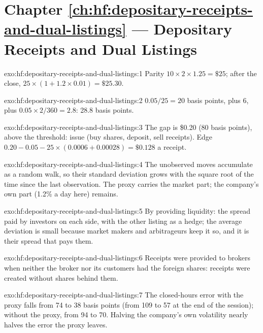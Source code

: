\section*{Chapter \ref{ch:hf:depositary-receipts-and-dual-listings} --- Depositary Receipts and Dual Listings}

\begin{solution}{exo:hf:depositary-receipts-and-dual-listings:1}
Parity $10\times2\times1.25=\$25$; after the close, $25\times(1+1.2\times0.01)=\$25.30$.
\end{solution}

\begin{solution}{exo:hf:depositary-receipts-and-dual-listings:2}
$0.05/25=20$ basis points, plus 6, plus $0.05\times2/360=2.8$: 28.8 basis points.
\end{solution}

\begin{solution}{exo:hf:depositary-receipts-and-dual-listings:3}
The gap is \$0.20 (80 basis points), above the threshold: issue (buy shares, deposit, sell receipts). Edge $0.20-0.05-25\times(0.0006+0.00028)=\$0.128$
a receipt.
\end{solution}

\begin{solution}{exo:hf:depositary-receipts-and-dual-listings:4}
The unobserved moves accumulate as a random walk, so their standard deviation grows with the square root of the time since the last observation. The
proxy carries the market part; the company's own part (1.2\% a day here) remains.
\end{solution}

\begin{solution}{exo:hf:depositary-receipts-and-dual-listings:5}
By providing liquidity: the spread paid by investors on each side, with the other listing as a hedge; the average deviation is small because market
makers and arbitrageurs keep it so, and it is their spread that pays them.
\end{solution}

\begin{solution}{exo:hf:depositary-receipts-and-dual-listings:6}
Receipts were provided to brokers when neither the broker nor its customers had the foreign shares: receipts were created without shares behind
them.
\end{solution}

\begin{solution}{exo:hf:depositary-receipts-and-dual-listings:7}
The closed-hours error with the proxy falls from 74 to 38 basis points (from 109 to 57 at the end of the session); without the proxy, from 94 to 70.
Halving the company's own volatility nearly halves the error the proxy leaves.
\end{solution}

